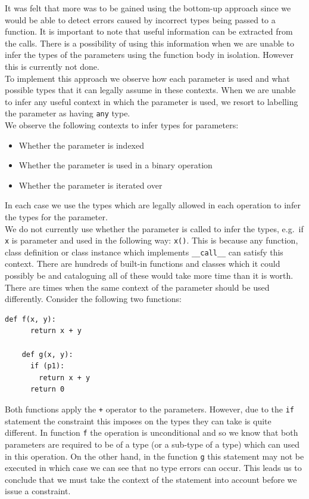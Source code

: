 \documentclass[12pt, titlepage]{article}
\begin{document}
It was felt that more was to be gained using the bottom-up approach since we would be able to detect errors caused by incorrect types being passed to a function. It is important to note that useful information can be extracted from the calls. There is a possibility of using this information when we are unable to infer the types of the parameters using the function body in isolation. However this is currently not done. \\
\indent To implement this approach we observe how each parameter is used and what possible types that it can legally assume in these contexts. When we are unable to infer any useful context in which the parameter is used, we resort to labelling the parameter as having \texttt{any} type. \\
\indent We observe the following contexts to infer types for parameters:
\begin{itemize}
	\item Whether the parameter is indexed
	\item Whether the parameter is used in a binary operation
	\item Whether the parameter is iterated over
\end{itemize}
In each case we use the types which are legally allowed in each operation to infer the types for the parameter. \\
\indent We do not currently use whether the parameter is called to infer the types, e.g.\ if \texttt{x} is parameter and used in the following way: \texttt{x()}. This is because any function, class definition or class instance which implements \texttt{\_\_call\_\_} can satisfy this context. There are hundreds of built-in functions and classes which it could possibly be and cataloguing all of these would take more time than it is worth. \\
\indent There are times when the same context of the parameter should be used differently. Consider the following two functions:
\begin{lstlisting}[mathescape]
	def f(x, y):
	  return x + y
		
	def g(x, y):
	  if (p1):
	    return x + y
	  return 0
\end{lstlisting}
Both functions apply the \texttt{+} operator to the parameters. However, due to the \texttt{if} statement the constraint this imposes on the types they can take is quite different. In function \texttt{f} the operation is unconditional and so we know that both parameters are required to be of a type (or a sub-type of a type) which can used in this operation. On the other hand, in the function \texttt{g} this statement may not be executed in which case we can see that no type errors can occur. This leads us to conclude that we must take the context of the statement into account before we issue a constraint.
\end{document}
